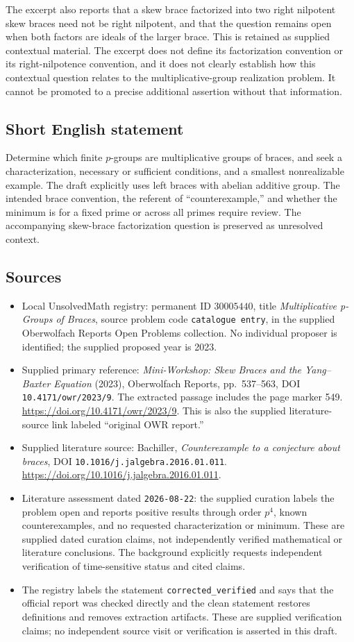 \documentclass[11pt]{article}
\begin{document}
The excerpt also reports that a skew brace factorized into two right nilpotent skew braces need not be right nilpotent, and that the question remains open when both factors are ideals of the larger brace. This is retained as supplied contextual material. The excerpt does not define its factorization convention or its right-nilpotence convention, and it does not clearly establish how this contextual question relates to the multiplicative-group realization problem. It cannot be promoted to a precise additional assertion without that information.
\subsection{Short English statement}
Determine which finite \(p\)-groups are multiplicative groups of braces, and seek a characterization, necessary or sufficient conditions, and a smallest nonrealizable example. The draft explicitly uses left braces with abelian additive group. The intended brace convention, the referent of ``counterexample,'' and whether the minimum is for a fixed prime or across all primes require review. The accompanying skew-brace factorization question is preserved as unresolved context.
\subsection{Sources}
\begin{itemize}
\item Local UnsolvedMath registry: permanent ID \(30005440\), title \emph{Multiplicative p-Groups of Braces}, source problem code \texttt{catalogue entry}, in the supplied Oberwolfach Reports Open Problems collection. No individual proposer is identified; the supplied proposed year is 2023.
\item Supplied primary reference: \emph{Mini-Workshop: Skew Braces and the Yang--Baxter Equation} (2023), Oberwolfach Reports, pp.~537--563, DOI \texttt{10.4171/owr/2023/9}. The extracted passage includes the page marker 549. \url{https://doi.org/10.4171/owr/2023/9}. This is also the supplied literature-source link labeled ``original OWR report.''
\item Supplied literature source: Bachiller, \emph{Counterexample to a conjecture about braces}, DOI \texttt{10.1016/j.jalgebra.2016.01.011}. \url{https://doi.org/10.1016/j.jalgebra.2016.01.011}.
\item Literature assessment dated \texttt{2026-08-22}: the supplied curation labels the problem open and reports positive results through order \(p^4\), known counterexamples, and no requested characterization or minimum. These are supplied dated curation claims, not independently verified mathematical or literature conclusions. The background explicitly requests independent verification of time-sensitive status and cited claims.
\item The registry labels the statement \texttt{corrected\_verified} and says that the official report was checked directly and the clean statement restores definitions and removes extraction artifacts. These are supplied verification claims; no independent source visit or verification is asserted in this draft.
\end{itemize}
\end{document}
